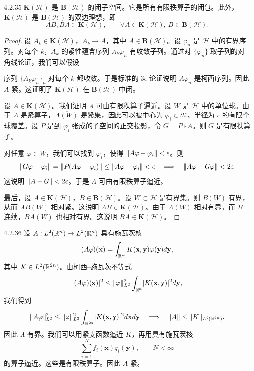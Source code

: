 \begin{proposition}{4.2.35}
  $\mathbf{K}(\mathcal{H})$ 是 $\mathbf{B}(\mathcal{H})$ 的闭子空间。它是所有有限秩算子的闭包。此外，$\mathbf{K}(\mathcal{H})$ 是 $\mathbf{B}(\mathcal{H})$ 的双边理想，即
  \[
  AB,BA\in\mathbf{K}(\mathcal{H}),
  \qquad\forall A\in\mathbf{K}(\mathcal{H}),\ B\in\mathbf{B}(\mathcal{H}).
  \]
\end{proposition}

\begin{proof}
  设 $A_k\in\mathbf{K}(\mathcal{H})$，$A_k\to A$，其中 $A\in\mathbf{B}(\mathcal{H})$。设 $\varphi_n$ 是 $\mathcal{H}$ 中的有界序列。对每个 $k$，$A_k$ 的紧性蕴含序列 $A_k\varphi_n$ 有收敛子列。通过对 $\{\varphi_n\}$ 取子列的对角线论证，我们可以假设

  序列 $\{A_k\varphi_n\}_n$ 对每个 $k$ 都收敛。于是标准的 $3\epsilon$ 论证说明 $A\varphi_n$ 是柯西序列。因此 $A$ 紧。这证明了 $\mathbf{K}(\mathcal{H})$ 在 $\mathbf{B}(\mathcal{H})$ 中闭。

  设 $A\in\mathbf{K}(\mathcal{H})$。我们证明 $A$ 可由有限秩算子逼近。设 $W$ 是 $\mathcal{H}$ 中的单位球。由于 $A$ 是紧算子，$\overline{A(W)}$ 是紧集，因此可以被中心为 $\varphi_i\in\mathcal{H}$、半径为 $\epsilon$ 的有限个球覆盖。设 $P$ 是到 $\varphi_i$ 张成的子空间的正交投影，令 $G=P\circ A$。则 $G$ 是有限秩算子。

  对任意 $\varphi\in W$，我们可以找到 $\varphi_i$，使得 $\lVert A\varphi-\varphi_i\rVert<\epsilon$。则
  \[
  \lVert G\varphi-\varphi_i\rVert=\lVert P(A\varphi-\varphi_i)\rVert
  \le\lVert A\varphi-\varphi_i\rVert<\epsilon
  \quad\Longrightarrow\quad
  \lVert A\varphi-G\varphi\rVert<2\epsilon.
  \]
  这说明 $\lVert A-G\rVert<2\epsilon$。于是 $A$ 可由有限秩算子逼近。

  最后，设 $A\in\mathbf{K}(\mathcal{H})$，$B\in\mathbf{B}(\mathcal{H})$。设 $W\subset\mathcal{H}$ 是有界集。则 $B(W)$ 有界，从而 $AB(W)$ 相对紧。这说明 $AB\in\mathbf{K}(\mathcal{H})$。由于 $A(W)$ 相对有界，而 $B$ 连续，$BA(W)$ 也相对有界。这说明 $BA\in\mathbf{K}(\mathcal{H})$。
\end{proof}


\begin{example}{4.2.36}
  设 $A:L^2(\mathbb{R}^n)\to L^2(\mathbb{R}^n)$ 具有施瓦茨核
  \[
  (A\varphi)(\mathbf{x})=\int_{\mathbb{R}^n}K(\mathbf{x},\mathbf{y})\varphi(\mathbf{y})d\mathbf{y},
  \]
  其中 $K\in L^2(\mathbb{R}^{2n})$。由柯西–施瓦茨不等式
  \[
  \lvert (A\varphi)(\mathbf{x})\rvert^2
  \le\lVert \varphi\rVert_{L^2}^2\int_{\mathbb{R}^n}\lvert K(\mathbf{x},\mathbf{y})\rvert^2d\mathbf{y},
  \]
  我们得到
  \[
  \lVert A\varphi\rVert_{L^2}^2
  \le\lVert \varphi\rVert_{L^2}^2\int_{\mathbb{R}^{2n}}\lvert K(\mathbf{x},\mathbf{y})\rvert^2d\mathbf{x}d\mathbf{y}
  \quad\Longrightarrow\quad
  \lVert A\rVert\le\lVert K\rVert_{L^2(\mathbb{R}^{2n})}.
  \]
  因此 $A$ 有界。我们可以用紧支函数逼近 $K$，再用具有施瓦茨核
  \[
  \sum_{i=1}^{N}f_i(\mathbf{x})g_i(\mathbf{y}),\qquad N<\infty
  \]
  的算子逼近。这些是有限秩算子。因此 $A$ 紧。
\end{example}

